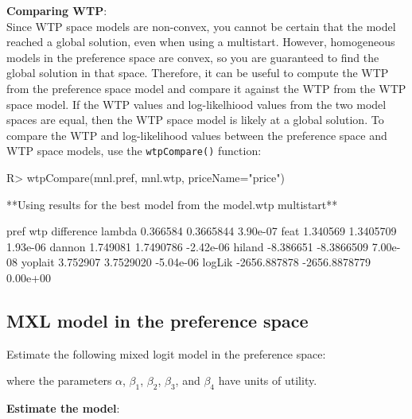 \documentclass[article]{jss}
\begin{document}
\textbf{Comparing WTP}:\\
Since WTP space models are non-convex, you cannot be certain that the
model reached a global solution, even when using a multistart. However,
homogeneous models in the preference space are convex, so you are
guaranteed to find the global solution in that space. Therefore, it can
be useful to compute the WTP from the preference space model and compare
it against the WTP from the WTP space model. If the WTP values and
log-likelhiood values from the two model spaces are equal, then the WTP
space model is likely at a global solution. To compare the WTP and
log-likelihood values between the preference space and WTP space models,
use the \texttt{wtpCompare()} function:

\begin{CodeChunk}

\begin{CodeInput}
R> wtpCompare(mnl.pref, mnl.wtp, priceName="price")
\end{CodeInput}

\begin{CodeOutput}
**Using results for the best model from the model.wtp multistart**
\end{CodeOutput}

\begin{CodeOutput}
                pref           wtp difference
lambda      0.366584     0.3665844   3.90e-07
feat        1.340569     1.3405709   1.93e-06
dannon      1.749081     1.7490786  -2.42e-06
hiland     -8.386651    -8.3866509   7.00e-08
yoplait     3.752907     3.7529020  -5.04e-06
logLik  -2656.887878 -2656.8878779   0.00e+00
\end{CodeOutput}
\end{CodeChunk}

\newpage

\hypertarget{mxl-model-in-the-preference-space}{%
\subsection{MXL model in the preference
space}\label{mxl-model-in-the-preference-space}}

Estimate the following mixed logit model in the preference space:



where the parameters \(\alpha\), \(\beta_1\), \(\beta_2\), \(\beta_3\),
and \(\beta_4\) have units of utility.

\textbf{Estimate the model}:
\end{document}
